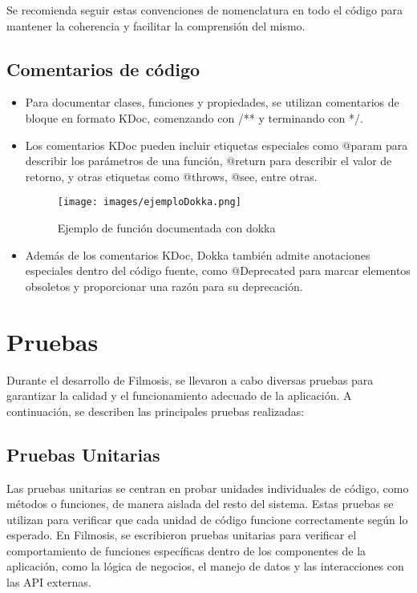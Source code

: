 \documentclass{article}
\begin{document}
    Se recomienda seguir estas convenciones de nomenclatura en todo el código para mantener la coherencia y facilitar la comprensión del mismo.

\subsection{Comentarios de código}

\begin{itemize}
    \item Para documentar clases, funciones y propiedades, se utilizan comentarios de bloque en formato KDoc, comenzando con /** y terminando con */.
    \item Los comentarios KDoc pueden incluir etiquetas especiales como @param para describir los parámetros de una función, @return para describir el valor de retorno, y otras etiquetas como @throws, @see, entre otras.

    \begin{figure}[h]
            \centering
            \texttt{[image: images/ejemploDokka.png]}
            \caption{Ejemplo de función documentada con dokka}
            \label{fig:instalacion_apk}
    \end{figure}
    
    \item Además de los comentarios KDoc, Dokka también admite anotaciones especiales dentro del código fuente, como @Deprecated para marcar elementos obsoletos y proporcionar una razón para su deprecación.

\end{itemize}

\section{Pruebas}

Durante el desarrollo de Filmosis, se llevaron a cabo diversas pruebas para garantizar la calidad y el funcionamiento adecuado de la aplicación. A continuación, se describen las principales pruebas realizadas:

\subsection{Pruebas Unitarias}

Las pruebas unitarias se centran en probar unidades individuales de código, como métodos o funciones, de manera aislada del resto del sistema. Estas pruebas se utilizan para verificar que cada unidad de código funcione correctamente según lo esperado. En Filmosis, se escribieron pruebas unitarias para verificar el comportamiento de funciones específicas dentro de los componentes de la aplicación, como la lógica de negocios, el manejo de datos y las interacciones con las API externas.
\end{document}
